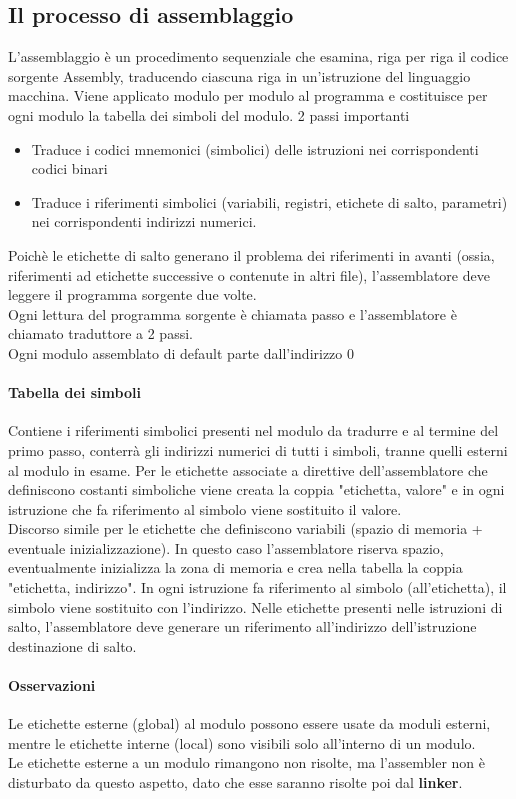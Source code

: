 \documentclass[12pt, a4paper, openany]{book}
\begin{document}
\subsection{Il processo di assemblaggio}
L'assemblaggio è un procedimento sequenziale che esamina, riga per riga il codice sorgente
Assembly, traducendo ciascuna riga in un'istruzione del linguaggio macchina.
Viene applicato modulo per modulo al programma e costituisce per ogni modulo la tabella dei 
simboli del modulo.
2 passi importanti \begin{itemize}
    \item Traduce i codici mnemonici (simbolici) delle istruzioni nei corrispondenti
    codici binari
    \item Traduce i riferimenti simbolici (variabili, registri, etichete di salto, parametri)
    nei corrispondenti indirizzi numerici.
\end{itemize}
Poichè le etichette di salto generano il problema dei riferimenti in avanti (ossia,
riferimenti ad etichette successive o contenute in altri file), l'assemblatore deve leggere
il programma sorgente due volte.
\\ Ogni lettura del programma sorgente è chiamata passo e l'assemblatore è chiamato traduttore
a 2 passi.
\\ Ogni modulo assemblato di default parte dall'indirizzo 0
\paragraph*{Tabella dei simboli} Contiene i riferimenti simbolici presenti nel modulo
da tradurre e al termine del primo passo, conterrà gli indirizzi numerici
di tutti i simboli, tranne quelli esterni al modulo in esame.
Per le etichette associate a direttive dell'assemblatore che definiscono costanti
simboliche viene creata la coppia "etichetta, valore" e in ogni istruzione che
fa riferimento al simbolo viene sostituito il valore.
\\ Discorso simile per le etichette che definiscono variabili (spazio di memoria +
eventuale inizializzazione). In questo caso l'assemblatore riserva spazio, eventualmente
inizializza la zona di memoria e crea nella tabella la coppia "etichetta, indirizzo".
In ogni istruzione fa riferimento al simbolo (all'etichetta), il simbolo viene
sostituito con l'indirizzo.
Nelle etichette presenti nelle istruzioni di salto, l'assemblatore deve generare un
riferimento all'indirizzo dell'istruzione destinazione di salto.
\paragraph*{Osservazioni} Le etichette esterne (global) al modulo possono essere usate
da moduli esterni, mentre le etichette interne (local) sono visibili solo all'interno 
di un modulo.
\\ Le etichette esterne a un modulo rimangono non risolte, ma l'assembler non è disturbato
da questo aspetto, dato che esse saranno risolte poi dal \textbf{linker}.
\end{document}

